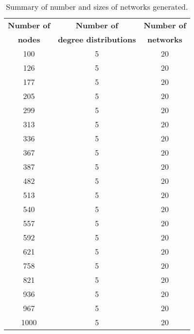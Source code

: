 

\begin{table}
\centering

\begin{tabular}{ccc}
\toprule
\textbf{Number of} & \textbf{Number of} & \textbf{Number of}\\
\textbf{nodes} & \textbf{degree distributions} & \textbf{networks}\\
\midrule
100 & 5 & 20\\
126 & 5 & 20\\
177 & 5 & 20\\
205 & 5 & 20\\
299 & 5 & 20\\
313 & 5 & 20\\
336 & 5 & 20\\
367 & 5 & 20\\
387 & 5 & 20\\
482 & 5 & 20\\
513 & 5 & 20\\
540 & 5 & 20\\
557 & 5 & 20\\
592 & 5 & 20\\
621 & 5 & 20\\
758 & 5 & 20\\
821 & 5 & 20\\
936 & 5 & 20\\
967 & 5 & 20\\
1000 & 5 & 20\\

\bottomrule

\end{tabular}

\caption[]{\label{tab:ch2:networkSize}Summary of number and sizes of networks generated.}
\end{table}


